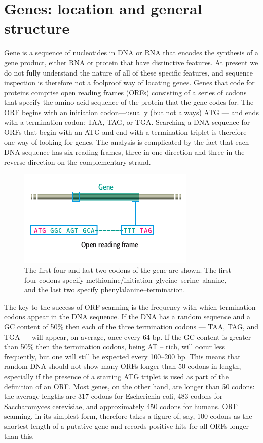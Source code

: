 \section{Genes: location and general structure}
Gene is a sequence of nucleotides in DNA or RNA that encodes the synthesis of a gene product, either RNA or protein that have distinctive features. At present we 
do not fully understand the nature of all of these specific features, and sequence inspection is therefore not a foolproof way of locating genes. 
Genes that code for proteins comprise open reading frames (ORFs) consisting of a series of codons that specify the amino acid sequence of the protein
that the gene codes for. The ORF begins with an initiation codon—usually (but not always) ATG — and ends with a termination codon: TAA, TAG, or TGA. 
Searching a DNA sequence for ORFs that begin with an ATG and end with a termination triplet is therefore one way of looking for genes. The analysis is 
complicated by the fact that each DNA sequence has six reading frames, three in one direction and three in the reverse direction on the complementary strand.

\begin{figure}[!ht]
	\centering
	\includegraphics[width=.9\textwidth]{figures/ORF1.png}
	\caption{The
	first four and last two codons of the gene
	are shown. The first four codons specify
	methionine/initiation–glycine–serine–alanine,
	and the last two specify
	phenylalanine–termination.\label{o:latex_friendly_zone}}
\end{figure}


The key to the success of ORF scanning is the frequency with which termination codons appear in the DNA sequence. If the DNA has a random sequence
and a GC content of 50\% then each of the three termination codons — TAA, TAG, and TGA — will appear, on average, once every 64 bp. If the GC content 
is greater than 50\% then the termination codons, being AT – rich, will occur less frequently, but one will still be expected every 100–200 bp. This
means that random DNA should not show many ORFs longer than 50 codons in length, especially if the presence of a starting ATG triplet is used as part of
the definition of an ORF. Most genes, on the other hand, are longer than 50 codons: the average lengths are 317 codons for Escherichia coli, 483 codons
for Saccharomyces cerevisiae, and approximately 450 codons for humans. ORF scanning, in its simplest form, therefore takes a figure of, say, 100 codons
as the shortest length of a putative gene and records positive hits for all ORFs longer than this.


